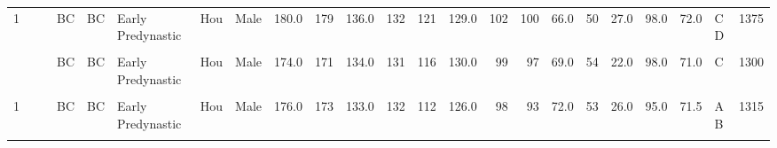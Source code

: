 \begin{table}[p]
{\begin{tabular}{rrrlllllrrrrrrrrrrrrrlr}
1 &  &  & BC & BC & Early Predynastic & Hou & Male & 180.0 & 179 & 136.0 & 132 & 121 & 129.0 & 102 & 100 & 66.0 & 50 & 27.0 & 98.0 & 72.0 & C D & 1375\\
\cellcolor{gray!10}{1} & \cellcolor{gray!10}{} & \cellcolor{gray!10}{} & \cellcolor{gray!10}{BC} & \cellcolor{gray!10}{BC} & \cellcolor{gray!10}{Early Predynastic} & \cellcolor{gray!10}{Hou} & \cellcolor{gray!10}{Male} & \cellcolor{gray!10}{181.0} & \cellcolor{gray!10}{179} & \cellcolor{gray!10}{140.0} & \cellcolor{gray!10}{141} & \cellcolor{gray!10}{114} & \cellcolor{gray!10}{125.0} & \cellcolor{gray!10}{102} & \cellcolor{gray!10}{100} & \cellcolor{gray!10}{72.0} & \cellcolor{gray!10}{51} & \cellcolor{gray!10}{27.0} & \cellcolor{gray!10}{98.0} & \cellcolor{gray!10}{70.0} & \cellcolor{gray!10}{C} & \cellcolor{gray!10}{1520}\\
\addlinespace
1 &  &  & BC & BC & Early Predynastic & Hou & Male & 174.0 & 171 & 134.0 & 131 & 116 & 130.0 & 99 & 97 & 69.0 & 54 & 22.0 & 98.0 & 71.0 & C & 1300\\
\cellcolor{gray!10}{1} & \cellcolor{gray!10}{} & \cellcolor{gray!10}{} & \cellcolor{gray!10}{BC} & \cellcolor{gray!10}{BC} & \cellcolor{gray!10}{Early Predynastic} & \cellcolor{gray!10}{Hou} & \cellcolor{gray!10}{Male} & \cellcolor{gray!10}{178.0} & \cellcolor{gray!10}{178} & \cellcolor{gray!10}{137.0} & \cellcolor{gray!10}{135} & \cellcolor{gray!10}{112} & \cellcolor{gray!10}{122.0} & \cellcolor{gray!10}{109} & \cellcolor{gray!10}{103} & \cellcolor{gray!10}{74.0} & \cellcolor{gray!10}{50} & \cellcolor{gray!10}{24.0} & \cellcolor{gray!10}{94.5} & \cellcolor{gray!10}{74.0} & \cellcolor{gray!10}{A B} & \cellcolor{gray!10}{1400}\\
1 &  &  & BC & BC & Early Predynastic & Hou & Male & 176.0 & 173 & 133.0 & 132 & 112 & 126.0 & 98 & 93 & 72.0 & 53 & 26.0 & 95.0 & 71.5 & A B & 1315\\
\cellcolor{gray!10}{1} & \cellcolor{gray!10}{} & \cellcolor{gray!10}{} & \cellcolor{gray!10}{BC} & \cellcolor{gray!10}{BC} & \cellcolor{gray!10}{Early Predynastic} & \cellcolor{gray!10}{Hou} & \cellcolor{gray!10}{Male} & \cellcolor{gray!10}{181.0} & \cellcolor{gray!10}{179} & \cellcolor{gray!10}{136.0} & \cellcolor{gray!10}{139} & \cellcolor{gray!10}{116} & \cellcolor{gray!10}{} & \cellcolor{gray!10}{98} & \cellcolor{gray!10}{96} & \cellcolor{gray!10}{70.0} & \cellcolor{gray!10}{50} & \cellcolor{gray!10}{27.0} & \cellcolor{gray!10}{98.0} & \cellcolor{gray!10}{70.0} & \cellcolor{gray!10}{} & \cellcolor{gray!10}{1460}\\

\end{tabular}}
\end{table}
